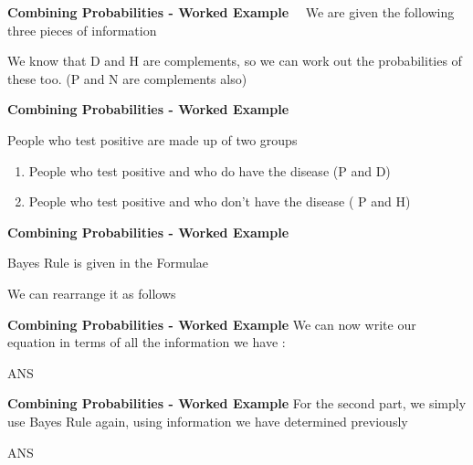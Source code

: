 \documentclass[IntroMain.tex]{subfiles}
\begin{document}
\begin{frame}
	\textbf{Combining Probabilities - Worked Example} 
We are given the following three pieces of information
 

We know that D and H are complements, so we can work out the probabilities of these too. (P and N are complements also)

\end{frame}
\begin{frame}
	\textbf{Combining Probabilities - Worked Example}

People who test positive are made up of two groups
\begin{enumerate}
\item	People who test positive and who do have the disease  (P and D)
\item	People who test positive and who don’t have the disease  ( P and H)
\end{enumerate}
	\end{frame}
	\begin{frame}
		\textbf{Combining Probabilities - Worked Example}

Bayes Rule is given in the Formulae 		 

We can rearrange it as follows 		 

\end{frame}
\begin{frame}
	\textbf{Combining Probabilities - Worked Example}
We can now write our equation in terms of all the information we have :

   ANS

\end{frame}
\begin{frame}
	\textbf{Combining Probabilities - Worked Example}
For the second part, we simply use Bayes Rule again, using information we have determined previously

  ANS
  
\end{frame}
\end{document}
